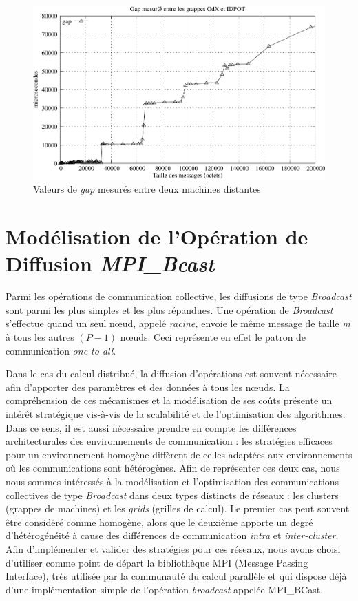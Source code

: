 %
\begin{figure}
\centering
\includegraphics[width=0.7\linewidth]{images/p2p/hockney-logp1}

\caption{\label{Figure: logp x hockney}Valeurs de \textit{gap} mesurés entre deux machines distantes \cite{Steffenel05c}}

\end{figure}



\section{Modélisation de l'Opération de Diffusion \textit{MPI\_Bcast}}

Parmi les opérations de communication collective, les diffusions de type \textit{Broadcast} sont parmi les plus simples et les plus répandues. Une opération de \emph{Broadcast} s'effectue quand un seul n{\oe}ud,
appelé \emph{racine,} envoie le même message de taille \emph{m} à
tous les autres $(P-1)$ n{\oe}uds.  Ceci représente en effet le patron de communication \textit{one-to-all}. 

Dans le cas du calcul distribué, la diffusion d'opérations est souvent nécessaire afin d'apporter des paramètres et des données à tous les n{\oe}uds.  La compréhension de ces mécanismes et la modélisation de ses coûts présente un intérêt stratégique vis-à-vis de la scalabilité et de l'optimisation des algorithmes. Dans ce sens, il est aussi nécessaire prendre en compte les différences architecturales des environnements de communication : les stratégies efficaces pour un environnement homogène diffèrent de celles adaptées aux environnements où les communications sont hétérogènes. Afin de représenter ces deux cas, nous nous sommes intéressés à la modélisation et l'optimisation des communications collectives de type \textit{Broadcast} dans deux types distincts de réseaux : les clusters (grappes de machines) et les \textit{grids} (grilles de calcul). Le premier cas  peut souvent être considéré comme homogène, alors que le deuxième apporte un degré d'hétérogénéité à cause des différences de communication \textit{intra} et \textit{inter-cluster}. Afin d'implémenter et valider des stratégies pour ces réseaux, nous avons choisi d'utiliser comme point de départ la bibliothèque MPI (Message Passing Interface), très utilisée par la communauté du calcul parallèle et qui dispose déjà d'une implémentation simple de l'opération \textit{broadcast} appelée MPI\_BCast.   

